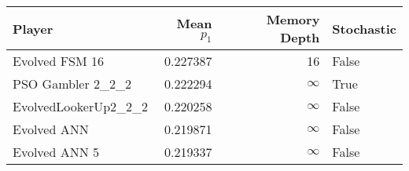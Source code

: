 \begin{tabular}{lrrl}
\toprule
               Player &  Mean $p_1$ &  Memory Depth & Stochastic \\
\midrule
       Evolved FSM 16 &    0.227387 &            16 &      False \\
    PSO Gambler 2\_2\_2 &    0.222294 &            \(\infty\) &       True \\
 EvolvedLookerUp2\_2\_2 &    0.220258 &            \(\infty\) &      False \\
          Evolved ANN &    0.219871 &            \(\infty\) &      False \\
        Evolved ANN 5 &    0.219337 &            \(\infty\) &      False \\
\bottomrule
\end{tabular}
